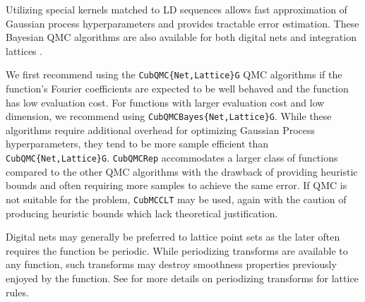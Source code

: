 \documentclass[graybox]{svmult}
\begin{document}
\begin{description}
    Utilizing special kernels matched to LD sequences allows fast approximation of Gaussian process hyperparameters and provides tractable error estimation. These Bayesian QMC algorithms are also available for both digital nets \cite{cubqmcbayes_thesis} and integration lattices  \cite{cubqmcbayeslattice}. 
\end{description}

We first recommend using the  \texttt{CubQMC\{Net,Lattice\}G} QMC algorithms if the function's Fourier coefficients are expected to be well behaved and the function has low evaluation cost. For functions with larger evaluation cost and low dimension, we recommend using  \texttt{CubQMCBayes\{Net,Lattice\}G}. While these algorithms require additional overhead for optimizing Gaussian Process hyperparameters, they tend to be more sample efficient than \texttt{CubQMC\{Net,Lattice\}G}. \texttt{CubQMCRep} accommodates a larger class of functions compared to the other QMC algorithms with the drawback of providing heuristic bounds and often requiring more samples to achieve the same error. If QMC is not suitable for the problem, \texttt{CubMCCLT} may be used, again with the caution of producing heuristic bounds which lack theoretical justification.

Digital nets may generally be preferred to lattice point sets as the later often requires the function be periodic. While periodizing transforms are available to any function, such transforms may destroy smoothness properties previously enjoyed by the function. See \cite[Chapter 16]{mcbook} for more details on periodizing transforms for lattice rules.

\end{document}
